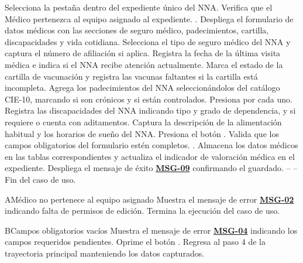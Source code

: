 \begin{UCtrayectoria}
	\UCpaso[\UCactor] Selecciona la pestaña  dentro del expediente único del NNA.
	\UCpaso Verifica que el Médico pertenezca al equipo asignado al expediente. .
	\UCpaso Despliega el formulario de datos médicos con las secciones de seguro médico, padecimientos, cartilla, discapacidades y vida cotidiana.
	\UCpaso[\UCactor] Selecciona el tipo de seguro médico del NNA y captura el número de afiliación si aplica.
	\UCpaso[\UCactor] Registra la fecha de la última visita médica e indica si el NNA recibe atención actualmente.
	\UCpaso[\UCactor] Marca el estado de la cartilla de vacunación y registra las vacunas faltantes si la cartilla está incompleta.
	\UCpaso[\UCactor] Agrega los padecimientos del NNA seleccionándolos del catálogo CIE-10, marcando si son crónicos y si están controlados. Presiona  por cada uno.
	\UCpaso[\UCactor] Registra las discapacidades del NNA indicando tipo y grado de dependencia, y si requiere o cuenta con aditamentos.
	\UCpaso[\UCactor] Captura la descripción de la alimentación habitual y los horarios de sueño del NNA.
	\UCpaso[\UCactor] Presiona el botón .
	\UCpaso Valida que los campos obligatorios del formulario estén completos. .
	\UCpaso Almacena los datos médicos en las tablas correspondientes y actualiza el indicador de valoración médica en el expediente.
	\UCpaso Despliega el mensaje de éxito \hyperlink{mMSG09}{\bf MSG-09} confirmando el guardado.
	\UCpaso[] -- -- Fin del caso de uso.
\end{UCtrayectoria}

\begin{UCtrayectoriaA}{A}{Médico no pertenece al equipo asignado}
	\UCpaso Muestra el mensaje de error \hyperlink{mMSG02}{\bf MSG-02} indicando falta de permisos de edición.
	\UCpaso Termina la ejecución del caso de uso.
\end{UCtrayectoriaA}

\begin{UCtrayectoriaA}{B}{Campos obligatorios vacíos}
	\UCpaso Muestra el mensaje de error \hyperlink{mMSG04}{\bf MSG-04} indicando los campos requeridos pendientes.
	\UCpaso[\UCactor] Oprime el botón .
	\UCpaso Regresa al paso 4 de la trayectoria principal manteniendo los datos capturados.
\end{UCtrayectoriaA}

